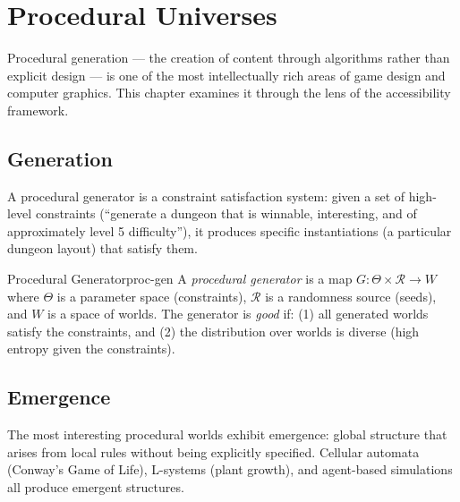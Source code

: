 \chapter{Procedural Universes}



Procedural generation — the creation of content through algorithms
rather than explicit design — is one of the most intellectually rich
areas of game design and computer graphics. This chapter examines
it through the lens of the accessibility framework.

\section{Generation}

A procedural generator is a constraint satisfaction system: given a
set of high-level constraints (``generate a dungeon that is winnable,
interesting, and of approximately level 5 difficulty''), it produces
specific instantiations (a particular dungeon layout) that satisfy them.

\begin{definition}{Procedural Generator}{proc-gen}
  A \emph{procedural generator} is a map $G : \Theta \times \mathcal{R}
  \to W$ where $\Theta$ is a parameter space (constraints), $\mathcal{R}$
  is a randomness source (seeds), and $W$ is a space of worlds.
  The generator is \emph{good} if: (1) all generated worlds satisfy
  the constraints, and (2) the distribution over worlds is diverse
  (high entropy given the constraints).
\end{definition}

\section{Emergence}

The most interesting procedural worlds exhibit emergence: global
structure that arises from local rules without being explicitly
specified. Cellular automata (Conway's Game of Life), L-systems
(plant growth), and agent-based simulations all produce emergent
structures.

